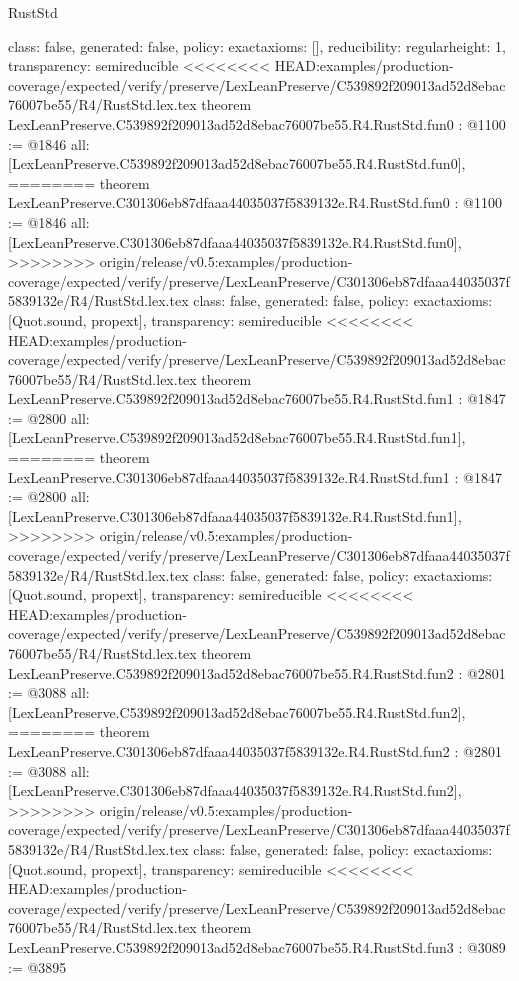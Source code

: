 \begin{lexlean}{RustStd}
\begin{coremodule}
{\begin{coremodule}
{{{  class: false,
  generated: false,
  policy: exact{axioms: []},
  reducibility: regular{height: 1},
  transparency: semireducible
}
<<<<<<<< HEAD:examples/production-coverage/expected/verify/preserve/LexLeanPreserve/C539892f209013ad52d8ebac76007be55/R4/RustStd.lex.tex
theorem LexLeanPreserve.C539892f209013ad52d8ebac76007be55.R4.RustStd.fun0 : @1100 := @1846 {
  all: [LexLeanPreserve.C539892f209013ad52d8ebac76007be55.R4.RustStd.fun0],
========
theorem LexLeanPreserve.C301306eb87dfaaa44035037f5839132e.R4.RustStd.fun0 : @1100 := @1846 {
  all: [LexLeanPreserve.C301306eb87dfaaa44035037f5839132e.R4.RustStd.fun0],
>>>>>>>> origin/release/v0.5:examples/production-coverage/expected/verify/preserve/LexLeanPreserve/C301306eb87dfaaa44035037f5839132e/R4/RustStd.lex.tex
  class: false,
  generated: false,
  policy: exact{axioms: [Quot.sound, propext]},
  transparency: semireducible
}
<<<<<<<< HEAD:examples/production-coverage/expected/verify/preserve/LexLeanPreserve/C539892f209013ad52d8ebac76007be55/R4/RustStd.lex.tex
theorem LexLeanPreserve.C539892f209013ad52d8ebac76007be55.R4.RustStd.fun1 : @1847 := @2800 {
  all: [LexLeanPreserve.C539892f209013ad52d8ebac76007be55.R4.RustStd.fun1],
========
theorem LexLeanPreserve.C301306eb87dfaaa44035037f5839132e.R4.RustStd.fun1 : @1847 := @2800 {
  all: [LexLeanPreserve.C301306eb87dfaaa44035037f5839132e.R4.RustStd.fun1],
>>>>>>>> origin/release/v0.5:examples/production-coverage/expected/verify/preserve/LexLeanPreserve/C301306eb87dfaaa44035037f5839132e/R4/RustStd.lex.tex
  class: false,
  generated: false,
  policy: exact{axioms: [Quot.sound, propext]},
  transparency: semireducible
}
<<<<<<<< HEAD:examples/production-coverage/expected/verify/preserve/LexLeanPreserve/C539892f209013ad52d8ebac76007be55/R4/RustStd.lex.tex
theorem LexLeanPreserve.C539892f209013ad52d8ebac76007be55.R4.RustStd.fun2 : @2801 := @3088 {
  all: [LexLeanPreserve.C539892f209013ad52d8ebac76007be55.R4.RustStd.fun2],
========
theorem LexLeanPreserve.C301306eb87dfaaa44035037f5839132e.R4.RustStd.fun2 : @2801 := @3088 {
  all: [LexLeanPreserve.C301306eb87dfaaa44035037f5839132e.R4.RustStd.fun2],
>>>>>>>> origin/release/v0.5:examples/production-coverage/expected/verify/preserve/LexLeanPreserve/C301306eb87dfaaa44035037f5839132e/R4/RustStd.lex.tex
  class: false,
  generated: false,
  policy: exact{axioms: [Quot.sound, propext]},
  transparency: semireducible
}
<<<<<<<< HEAD:examples/production-coverage/expected/verify/preserve/LexLeanPreserve/C539892f209013ad52d8ebac76007be55/R4/RustStd.lex.tex
theorem LexLeanPreserve.C539892f209013ad52d8ebac76007be55.R4.RustStd.fun3 : @3089 := @3895 {
}}}}}}
\end{coremodule}}
\end{coremodule}
\end{lexlean}

